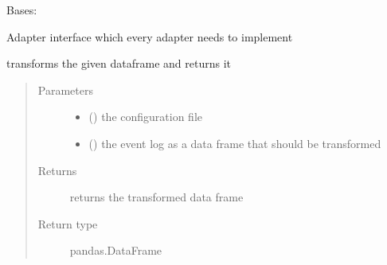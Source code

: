 \documentclass[letterpaper,10pt,english]{sphinxmanual}
\begin{document}

\begin{fulllineitems}
\label{\detokenize{event_log_analyzer:event_log_analyzer.adapter.Adapter}}
\sphinxAtStartPar
Bases: 

\sphinxAtStartPar
Adapter interface which every adapter needs to implement

\begin{fulllineitems}
\label{\detokenize{event_log_analyzer:event_log_analyzer.adapter.Adapter.transform}}
\sphinxAtStartPar
transforms the given dataframe and returns it
\begin{quote}\begin{description}
\item[{Parameters}] \leavevmode\begin{itemize}
\item {} 
\sphinxAtStartPar
{} () \textendash{} the configuration file

\item {} 
\sphinxAtStartPar
{} () \textendash{} the event log as a data frame that should be transformed

\end{itemize}

\item[{Returns}] \leavevmode
\sphinxAtStartPar
returns the transformed data frame

\item[{Return type}] \leavevmode
\sphinxAtStartPar
pandas.DataFrame

\end{description}\end{quote}

\end{fulllineitems}


\end{fulllineitems}
\end{document}
